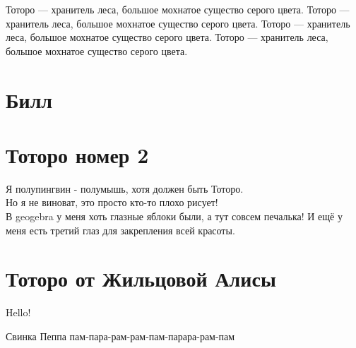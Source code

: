 \documentclass[12pt, a4paper]{article}
\begin{document}
\begin{pleasesay}{Тоторо --- хранитель леса, большое мохнатое существо серого цвета. Тоторо --- хранитель леса, большое мохнатое существо серого цвета. Тоторо --- хранитель леса, большое мохнатое существо серого цвета. Тоторо --- хранитель леса, большое мохнатое существо серого цвета.}
\end{pleasesay}


\newpage 

\section{Билл} 



\newpage

\section{Тоторо номер 2} 

\begin{center}
\begin{totoro}
Я полупингвин - полумышь, хотя должен быть Тоторо.\\
Но я не виноват, это просто кто-то плохо рисует!\\
В geogebra у меня хоть глазные яблоки были, а тут совсем печалька!
И ещё у меня есть третий глаз для закрепления всей красоты.
\end{totoro}
\end{center}



\newpage 


\section{Тоторо от Жильцовой Алисы} 

\begin{kot}
{Hello!}
\end{kot}


\newpage 

\begin{peppa}
	Свинка Пеппа пам-пара-рам-рам-пам-парара-рам-пам
\end{peppa}
\end{document}
